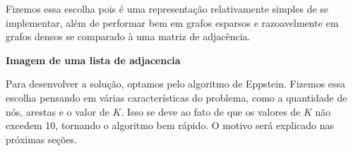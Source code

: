\documentclass{article}
\begin{document}
    Fizemos essa escolha pois é uma representação relativamente simples de se
    implementar, além de performar bem em grafos esparsos e razoavelmente em
    grafos densos se comparado à uma matriz de adjacência.

    \textbf{Imagem de uma lista de adjacencia}

    Para desenvolver a solução, optamos pelo algoritmo de Eppstein. Fizemos essa
    escolha pensando em várias características do problema, como a quantidade de
    nós, arestas e o valor de $K$. Isso se deve ao fato de que os valores de $K$
    não excedem 10, tornando o algoritmo bem rápido. O motivo será explicado nas
    próximas seções.
\end{document}
